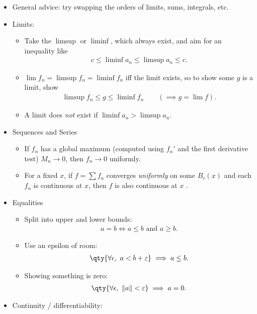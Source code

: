 \begin{itemize}
\item
  General advice: try swapping the orders of limits, sums, integrals,
  etc.
\item
  Limits:

  \begin{itemize}
  \tightlist
  \item
    Take the \(\limsup\) or \(\liminf\), which always exist, and aim for
    an inequality like
    \begin{align*}  
    c \leq \liminf a_n \leq \limsup a_n \leq c
    .\end{align*}
  \item
    \(\lim f_n = \limsup f_n = \liminf f_n\) iff the limit exists, so to
    show some \(g\) is a limit, show
    \begin{align*}  
    \limsup f_n \leq g \leq \liminf f_n \qquad (\implies g = \lim f) 
    .\end{align*}
  \item
    A limit does \emph{not} exist if \(\liminf a_n > \limsup a_n\).
  \end{itemize}
\item
  Sequences and Series

  \begin{itemize}
  \tightlist
  \item
    If \(f_n\) has a global maximum (computed using \(f_n'\) and the
    first derivative test) \(M_n \to 0\), then \(f_n \to 0\) uniformly.
  \item
    For a fixed \(x\), if \(f = \sum f_n\) converges \emph{uniformly} on
    some \(B_r(x)\) and each \(f_n\) is continuous at \(x\), then \(f\)
    is also continuous at \(x\) .
  \end{itemize}
\item
  Equalities

  \begin{itemize}
  \tightlist
  \item
    Split into upper and lower bounds:
    \begin{align*}  
    a=b \iff a\leq b \text{ and }  a\geq b
    .\end{align*}
  \item
    Use an epsilon of room:
    \begin{align*}  
    \qty{ \forall \epsilon, \,\,a < b + {\varepsilon}} \implies a\leq b 
    .\end{align*}
  \item
    Showing something is zero:
    \begin{align*}  
    \qty{ \forall \epsilon, \,\, {\left\lVert {a} \right\rVert} < {\varepsilon}} \implies a = 0
    .\end{align*}
  \end{itemize}
\item
  Continuity / differentiability:


\end{itemize}
